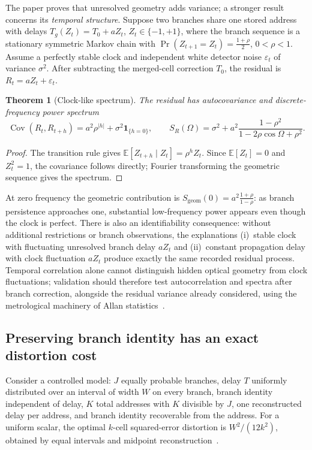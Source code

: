 \documentclass[11pt]{article}
\newtheorem{theorem}{Theorem}
\begin{document}
The paper proves that unresolved geometry adds variance; a stronger result concerns its
\emph{temporal structure}. Suppose two branches share one stored address with delays
$T_g(Z_t) = T_0 + aZ_t$, $Z_t \in \{-1,+1\}$, where the branch sequence is a stationary
symmetric Markov chain with
$\Pr(Z_{t+1} = Z_t) = \frac{1+\rho}{2}$, $0 < \rho < 1$. Assume a perfectly stable
clock and independent white detector noise $\varepsilon_t$ of variance $\sigma^2$.
After subtracting the merged-cell correction $T_0$, the residual is
$R_t = aZ_t + \varepsilon_t$.

\begin{theorem}[Clock-like spectrum]\label{thm:spectrum}
The residual has autocovariance and discrete-frequency power spectrum
\begin{equation}
\boxed{
\operatorname{Cov}(R_t,R_{t+h}) = a^2\rho^{|h|}+\sigma^2\mathbf{1}_{\{h=0\}},
\qquad
S_R(\Omega) = \sigma^2 + a^2\frac{1-\rho^2}{1-2\rho\cos\Omega+\rho^2}.
}
\end{equation}
\end{theorem}
\begin{proof}
The transition rule gives $\mathbb{E}[Z_{t+h} \mid Z_t] = \rho^h Z_t$. Since
$\mathbb{E}[Z_t] = 0$ and $Z_t^2 = 1$, the covariance follows directly; Fourier
transforming the geometric sequence gives the spectrum.
\end{proof}

At zero frequency the geometric contribution is
$S_{\mathrm{geom}}(0) = a^2\frac{1+\rho}{1-\rho}$: as branch persistence approaches
one, substantial low-frequency power appears even though the clock is perfect. There is
also an identifiability consequence: without additional restrictions or branch
observations, the explanations (i)~stable clock with fluctuating unresolved branch delay
$aZ_t$ and (ii)~constant propagation delay with clock fluctuation $aZ_t$ produce exactly
the same recorded residual process. Temporal correlation alone cannot distinguish hidden
optical geometry from clock fluctuations; validation should therefore test
autocorrelation and spectra after branch correction, alongside the residual variance
already considered, using the metrological machinery of Allan
statistics~\cite{allan1966}.

\subsection{Preserving branch identity has an exact distortion cost}

Consider a controlled model: $J$ equally probable branches, delay $T$ uniformly
distributed over an interval of width $W$ on every branch, branch identity independent
of delay, $K$ total addresses with $K$ divisible by $J$, one reconstructed delay per
address, and branch identity recoverable from the address. For a uniform scalar, the
optimal $k$-cell squared-error distortion is $W^2/(12k^2)$, obtained by equal intervals
and midpoint reconstruction~\cite{lloyd1982,gray1998}.
\end{document}
